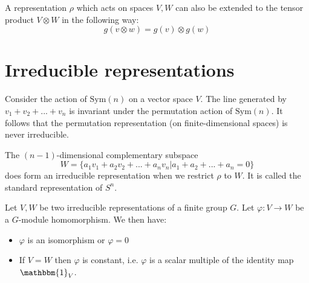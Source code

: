         \begin{example}
        	A representation $\rho$ which acts on spaces $V, W$ can also be extended to the tensor product  $V\otimes W$ in the following way:
            \begin{equation}
            	g(v\otimes w) = g(v)\otimes g(w)
            \end{equation}
        \end{example}

\section{Irreducible representations}

	
	\begin{example}
		Consider the action of $\text{Sym}(n)$ on a vector space $V$. The line generated by $v_1+v_2+...+v_n$ is invariant under the permutation action of $\text{Sym}(n)$. It follows that the permutation representation (on finite-dimensional spaces) is never irreducible.
		
		The $(n-1)$-dimensional complementary subspace
		\begin{equation}
			W = \{a_1v_1 + a_2v_2 + ... + a_nv_n|a_1 + a_2 + ... + a_n = 0\}
		\end{equation}
		does form an irreducible representation when we restrict $\rho$ to $W$. It is called the standard representation of $S^n$.
	\end{example}
        
        \begin{theorem}
        	Let $V, W$ be two irreducible representations of a finite group $G$. Let $\varphi: V\rightarrow W$ be a $G$-module homomorphism. We then have:
            \begin{itemize}
	            \item $\varphi$ is an isomorphism or $\varphi = 0$
                \item If $V = W$ then $\varphi$ is constant, i.e. $\varphi$ is a scalar multiple of the identity map $\mathbbm{1}_V$.
            \end{itemize}
        \end{theorem}
        
